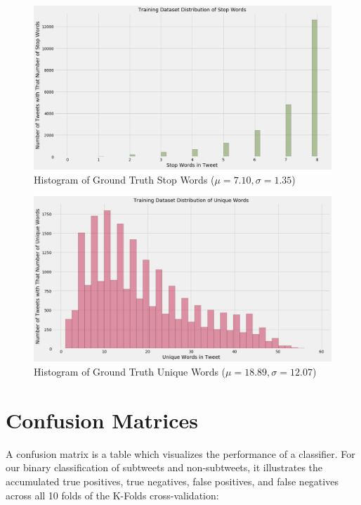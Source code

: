 \documentclass[11pt, twoside, reqno]{book}
\begin{document}
\begin{figure}[H]
	\centering
	\includegraphics[width=\textwidth]{stop_words_histogram}
	\caption{Histogram of Ground Truth Stop Words ($\mu=7.10, \sigma=1.35$)}
	\label{fig:tweet_stop_words}
\end{figure}

\begin{figure}[H]
	\centering
	\includegraphics[width=\textwidth]{unique_words_histogram}
	\caption{Histogram of Ground Truth Unique Words ($\mu=18.89, \sigma=12.07$)}
	\label{fig:tweet_unique_words}
\end{figure}

\section{Confusion Matrices}
\label{confusion_matrices}

A confusion matrix is a table which visualizes the performance of a classifier. For our binary classification of subtweets and non-subtweets, it illustrates the accumulated true positives, true negatives, false positives, and false negatives across all 10 folds of the K-Folds cross-validation:
\end{document}
